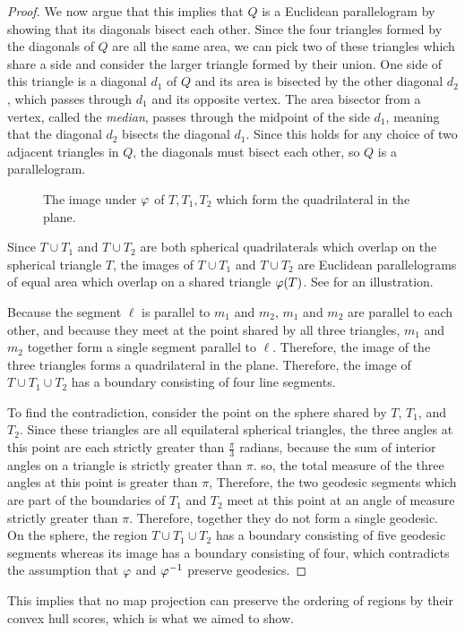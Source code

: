 \begin{proof}
		We now argue that this implies that $Q$ is a Euclidean parallelogram by showing that its diagonals bisect each other.  Since the four triangles 
		formed by the diagonals of $Q$ are all the same area, we can pick two of these triangles which share a side 
		and consider the larger triangle formed by their union.  One side of this triangle is a diagonal $d_1$ of $Q$ and its area is 
		bisected by the other diagonal $d_2$, which passes through $d_1$ and its opposite vertex.  The area bisector from a vertex, called the \textit{median}, passes through the midpoint of the side $d_1$, meaning that the diagonal $d_2$ bisects the diagonal $d_1$.  Since this holds for any choice of two adjacent triangles in $Q$, the diagonals must bisect each other, so $Q$ is a parallelogram.
		
		\begin{figure}[h]
			\centering
			
			\caption{The image under $\varphi$ of $T,T_1,T_2$ which form the quadrilateral in the plane.}
			\label{fig:sphtris_pl}
		\end{figure}
		

Since $T\cup T_1$ and $T\cup T_2$ are both spherical quadrilaterals which overlap on the spherical triangle $T$, the images of $T\cup T_1$ and $T\cup T_2$ are Euclidean parallelograms of equal area which overlap on a shared triangle $\varphi(T)$. See  for an illustration.
  
Because  the segment $\ell$ is parallel to $m_1$ and $m_2$, $m_1$ and $m_2$ are parallel to each other, and because they meet at the point shared by all three triangles, $m_1$ and $m_2$ together form a single segment parallel to $\ell$.  Therefore, the image of the three triangles forms a quadrilateral in the plane.
	Therefore, the image of $T\cup T_1\cup T_2$ has a boundary consisting of 
	four line segments.
	
	To find the contradiction, consider the point on the sphere shared by $T$, $T_1$, and $T_2$.  Since these triangles are all equilateral spherical triangles, the three angles at this point are each strictly greater than $\tfrac{\pi}{3}$ radians, because the sum of interior angles on a triangle is strictly greater than $\pi$.  
	so, the total measure of the three angles at this point is greater than $\pi$,  Therefore, the two geodesic segments which are part of the boundaries of $T_1$ and $T_2$ meet at this point at an angle of measure strictly greater than 
	$\pi$. Therefore, together they do not form a single geodesic.  On the sphere, the region $T\cup T_1\cup T_2$ has a boundary consisting of five geodesic segments whereas its image has a boundary consisting of four, which contradicts the assumption that $\varphi$ and $\varphi^{-1}$ preserve geodesics.
\end{proof}

This implies that no map projection can preserve the ordering of regions by their convex hull scores, which is what we aimed to show.

